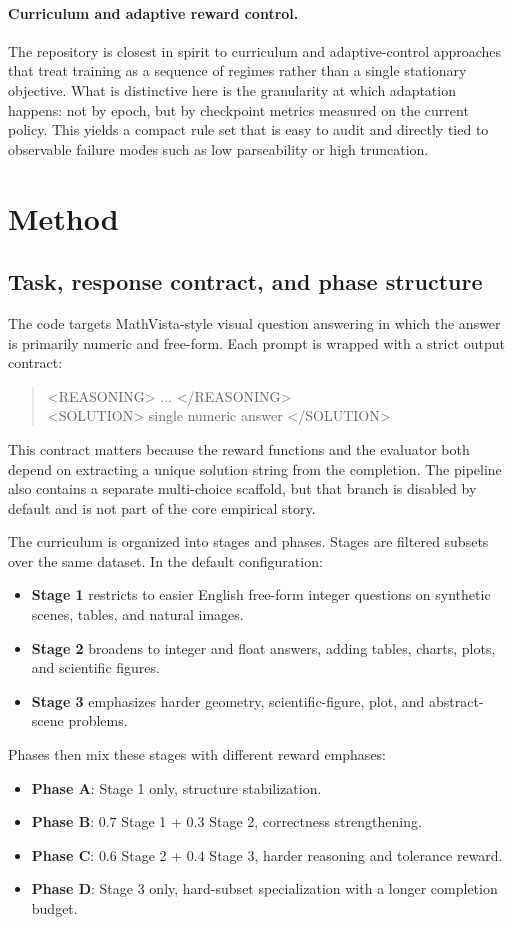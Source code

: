 \documentclass{article} %
\begin{document}
\paragraph{Curriculum and adaptive reward control.}
The repository is closest in spirit to curriculum and adaptive-control approaches that treat training as a sequence of regimes rather than a single stationary objective. What is distinctive here is the granularity at which adaptation happens: not by epoch, but by checkpoint metrics measured on the current policy. This yields a compact rule set that is easy to audit and directly tied to observable failure modes such as low parseability or high truncation.

\section{Method}

\subsection{Task, response contract, and phase structure}

The code targets MathVista-style visual question answering in which the answer is primarily numeric and free-form. Each prompt is wrapped with a strict output contract:
\begin{quote}
\small\ttfamily
<REASONING> ... </REASONING>\\
<SOLUTION> single numeric answer </SOLUTION>
\end{quote}
This contract matters because the reward functions and the evaluator both depend on extracting a unique solution string from the completion. The pipeline also contains a separate multi-choice scaffold, but that branch is disabled by default and is not part of the core empirical story.

The curriculum is organized into stages and phases. Stages are filtered subsets over the same dataset. In the default configuration:
\begin{itemize}[leftmargin=1.2em]
\item \textbf{Stage 1} restricts to easier English free-form integer questions on synthetic scenes, tables, and natural images.
\item \textbf{Stage 2} broadens to integer and float answers, adding tables, charts, plots, and scientific figures.
\item \textbf{Stage 3} emphasizes harder geometry, scientific-figure, plot, and abstract-scene problems.
\end{itemize}
Phases then mix these stages with different reward emphases:
\begin{itemize}[leftmargin=1.2em]
\item \textbf{Phase A}: Stage 1 only, structure stabilization.
\item \textbf{Phase B}: $0.7$ Stage 1 + $0.3$ Stage 2, correctness strengthening.
\item \textbf{Phase C}: $0.6$ Stage 2 + $0.4$ Stage 3, harder reasoning and tolerance reward.
\item \textbf{Phase D}: Stage 3 only, hard-subset specialization with a longer completion budget.
\end{itemize}
\end{document}
